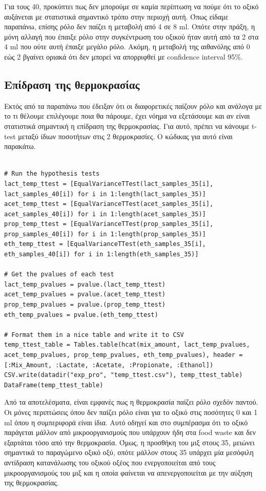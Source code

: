\documentclass[11pt]{article}
\begin{document}
Για τους 40, προκύπτει πως δεν μπορούμε σε καμία περίπτωση να πούμε ότι το οξικό αυξάνεται με στατιστικά σημαντικό τρόπο στην περιοχή αυτή. Όπως είδαμε παραπάνω, επίσης ρόλο δεν παίζει η μεταβολή από 4 σε 8 ml. Οπότε στην πράξη, η μόνη αλλαγή που έπαιξε ρόλο στην συγκέντρωση του οξικού ήταν αυτή από τα 2 στα 4 ml που ούτε αυτή έπαιξε μεγάλο ρόλο. Ακόμη, η μεταβολή της αιθανόλης από 0 εώς 2 βγαίνει οριακά ότι δεν μπορεί να απορριφθεί με confidence interval 95\%.

\subsection{Επίδραση της θερμοκρασίας}
\label{sec:org7bec9b6}
Εκτός από τα παραπάνω που έδειξαν ότι οι διαφορετικές παίζουν ρόλο και ανάλογα με το τι θέλουμε επιλέγουμε ποια θα πάρουμε, έχει νόημα να εξετάσουμε και αν είναι στατιστικά σημαντική η επίδραση της θερμοκρασίας. Για αυτό, πρέπει να κάνουμε t-test μεταξύ ίδιων ποσοτήτων στις 2 θερμοκρασίες. Ο κώδικας για αυτό είναι παρακάτω.

\begin{verbatim}

# Run the hypothesis tests
lact_temp_ttest = [EqualVarianceTTest(lact_samples_35[i], lact_samples_40[i]) for i in 1:length(lact_samples_35)]
acet_temp_ttest = [EqualVarianceTTest(acet_samples_35[i], acet_samples_40[i]) for i in 1:length(acet_samples_35)]
prop_temp_ttest = [EqualVarianceTTest(prop_samples_35[i], prop_samples_40[i]) for i in 1:length(prop_samples_35)]
eth_temp_ttest = [EqualVarianceTTest(eth_samples_35[i], eth_samples_40[i]) for i in 1:length(eth_samples_35)]

# Get the pvalues of each test
lact_temp_pvalues = pvalue.(lact_temp_ttest)
acet_temp_pvalues = pvalue.(acet_temp_ttest)
prop_temp_pvalues = pvalue.(prop_temp_ttest)
eth_temp_pvalues = pvalue.(eth_temp_ttest)

# Format them in a nice table and write it to CSV
temp_ttest_table = Tables.table(hcat(mix_amount, lact_temp_pvalues, acet_temp_pvalues, prop_temp_pvalues, eth_temp_pvalues), header = [:Mix_Amount, :Lactate, :Acetate, :Propionate, :Ethanol])
CSV.write(datadir("exp_pro", "temp_ttest.csv"), temp_ttest_table)
DataFrame(temp_ttest_table)
\end{verbatim}

Από τα αποτελέσματα, είναι εμφανές πως η θερμοκρασία παίζει ρόλο σχεδόν παντού. Οι μόνες περιπτώσεις όπου δεν παίζει ρόλο είναι για το οξικό στις ποσότητες 0 και 1 ml όπου η συμπεριφορά είναι ίδια. Αυτό οδηγεί και στο συμπέρασμα ότι το οξικό παράγεται μάλλον από μικροοργανισμούς που υπάρχουν ήδη στα food waste και δεν εξαρτάται τόσο από την θερμοκρασία. Όμως, η προσθήκη του μιξ στους 35, μειώνει σημαντικά το παραγώμενο οξικό οξύ, οπότε μάλλον στους 35 υπάρχει μία μεσόφιλη αντίδραση κατανάλωσης του οξικού οξέος που ενεργοποιείται από τους μικροοργανισμούς του μιξ και η οποία φαίνεται να απενεργοποιείται με την αύξηση της θερμοκρασίας.
\end{document}
